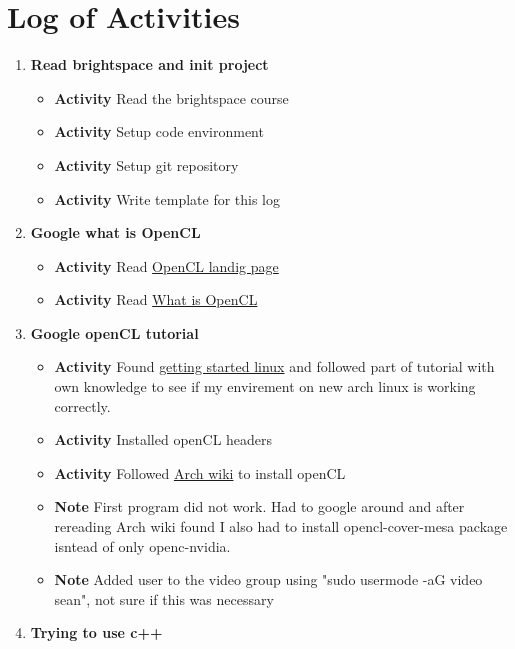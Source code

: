 \documentclass{article}
\begin{document}
\section*{Log of Activities}
\begin{enumerate}
    \item \textbf{Read brightspace and init project}
    \begin{itemize}
        \item \textbf{Activity} Read the brightspace course
        \item \textbf{Activity} Setup code environment
        \item \textbf{Activity} Setup git repository
        \item \textbf{Activity} Write template for this log
    \end{itemize}
    \item \textbf{Google what is OpenCL}
    \begin{itemize}
        \item \textbf{Activity} Read \href{https://www.khronos.org/api/index_2017/opencl/}{OpenCL landig page}
        \item \textbf{Activity} Read \href{https://medium.com/@bcrodrigues/what-is-opencl-14fbec353e09}{What is OpenCL}
    \end{itemize}
    \item \textbf{Google openCL tutorial}
    \begin{itemize}
        \item \textbf{Activity} Found \href{https://github.com/KhronosGroup/OpenCL-Guide/blob/main/chapters/getting_started_linux.md}{getting started linux} and followed part of tutorial with own knowledge to see if my envirement on new arch linux is working correctly.
        \item \textbf{Activity} Installed openCL headers
        \item \textbf{Activity} Followed \href{https://wiki.archlinux.org/title/GPGPU#OpenCL}{Arch wiki} to install openCL
        \item \textbf{Note} First program did not work. Had to google around and after rereading Arch wiki found I also had to install opencl-cover-mesa package isntead of only openc-nvidia.
        \item \textbf{Note} Added user to the video group using "sudo usermode -aG video sean", not sure if this was necessary
    \end{itemize}
    \item \textbf{Trying to use c++}

\end{enumerate}
\end{document}
